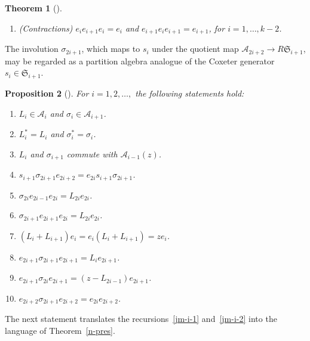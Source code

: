 \documentclass[11pt,a4paper,reqno,svgnames]{amsart}
\theoremstyle{plain}
\newtheorem{theorem}{Theorem}[section]
\newtheorem{proposition}[theorem]{Proposition}
\theoremstyle{definition}
\numberwithin{equation}{section}
\begin{document}
\begin{theorem}[{\cite[Theorem~4.1]{MR3035512}}]
\begin{enumerate}
\begin{enumerate}
\item $\sigma_{2i}e_{2j-1}=e_{2j-1}\sigma_{2i}$, if $j\ne i,i+1$. \label{com-6}
\item $\sigma_{2i}e_{2j+1}=e_{2j+1}\sigma_{2i}$, if $j\ne i-1$. \label{com-7}
\item $\sigma_{2i}e_{2i-1}\sigma_{2i}=\sigma_{2i+1}e_{2i+1}\sigma_{2i+1}$, for $i=1,\ldots,k-1$.\label{com-8}
\item $\sigma_{2i}e_{2i-2}\sigma_{2i}=\sigma_{2i-1}e_{2i} \sigma_{2i-1}$, for $i=2,\ldots,k-1$. \label{com-9}
\end{enumerate}
\item (Contractions) $e_ie_{i+1}e_i=e_i$ and $e_{i+1}e_ie_{i+1}=e_{i+1}$, for $i=1,\ldots,k-2$. 
\end{enumerate}
\end{theorem}
The involution $\sigma_{2i+1}$, which maps to $s_i$ under the quotient map $\mathcal{A}_{2i+2}\to R\mathfrak{S}_{i+1}$, may be regarded as a partition algebra analogue of the Coxeter generator $s_i\in\mathfrak{S}_{i+1}$. 
\begin{proposition}[{\cite[Sect.~3]{MR3035512}}]\label{a-c-r}
For $i=1,2,\ldots,$ the following statements hold:
\begin{enumerate}[label=(\arabic{*}), ref=\arabic{*},leftmargin=0pt,itemindent=1.5em]
\item $L_i\in\mathcal{A}_i$ and $\sigma_{i}\in\mathcal{A}_{i+1}$.\label{a-c-r-1}
 \item $L_{i}^*=L_i$ and $\sigma_{i}^*=\sigma_i$. \label{a-c-r-2}
\item $L_{i}$ and $\sigma_{i+1}$ commute with $\mathcal{A}_{i-1}(z)$.\label{a-c-r-10}
\item $s_{i+1}\sigma_{2i+1}e_{2i+2}=e_{2i}s_{i+1}\sigma_{2i+1}$.\label{a-c-r-4}
\item $\sigma_{2i}e_{2i-1}e_{2i}=L_{2i}e_{2i}$.\label{a-c-r-5}
\item $\sigma_{2i+1}e_{2i+1}e_{2i}=L_{2i}e_{2i}$.\label{a-c-r-6}
\label{a-c-r-9}
\item $(L_{i}+L_{i+1})e_{i}=e_{i}(L_{i}+L_{i+1})=z e_{i}$.\label{a-c-r-12}
\item $e_{2i+1}\sigma_{2i+1}e_{2i+1}=L_ie_{2i+1}$.\label{a-c-r-15}
\item $e_{2i+1}\sigma_{2i}e_{2i+1}=(z-L_{2i-1})e_{2i+1}$.\label{a-c-r-16}
\item $e_{2i+2}\sigma_{2i+1}e_{2i+2}=e_{2i}e_{2i+2}$.\label{a-c-r-17}
\end{enumerate}
\end{proposition}
The next statement translates the recursions~\eqref{jm-i-1} and~\eqref{jm-i-2} into the language of Theorem~\ref{n-pres}.
\end{document}
